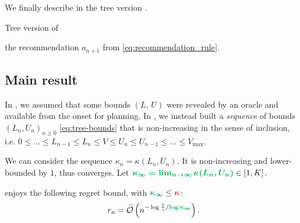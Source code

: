 \documentclass[runningheads]{llncs}
\begin{document}


We finally describe in  the tree version \GBOPD.

\begin{algorithm}[H]
	\caption{Tree version of }
	\label{alg:gbop-t}
	\DontPrintSemicolon
	\Return the recommendation $a_{n+1}$ from \eqref{eq:recommendation_rule}.\;
\end{algorithm}

\subsection{Main result}

In , we assumed that some bounds $(L,\,U)$ were revealed by an oracle and available from the onset for planning. In , we instead built a \emph{sequence} of bounds $(L_n,U_n)_{n\geq 0}$ \eqref{eq:tree-bounds} that is non-increasing in the sense of inclusion, i.e. $0\leq \dots\leq L_{n-1}\leq L_n\leq V\leq U_n\leq U_{n-1}\leq \dots\leq V_{\max}$.

We can consider the sequence $\kappa_n = \kappa(L_n, U_n)$. It is non-increasing and lower-bounded by $1$, thus converges. Let $\hlgb{\kappa_\infty = \lim_{n\rightarrow\infty} \kappa(L_n, U_n)} \in[1,K]$.

\begin{theorem}
\label{thm:regret-state-aware}
 enjoys the following regret bound, with $\hlgb{\kappa_\infty} \leq \hlrb{\kappa}$: 
\begin{align*}
r_n = \tilde{\cO}\left(n^{-\log \frac{1}{\gamma}/\hlgb{\log \kappa_\infty}}\right).
\end{align*}
\end{theorem}
\end{document}

